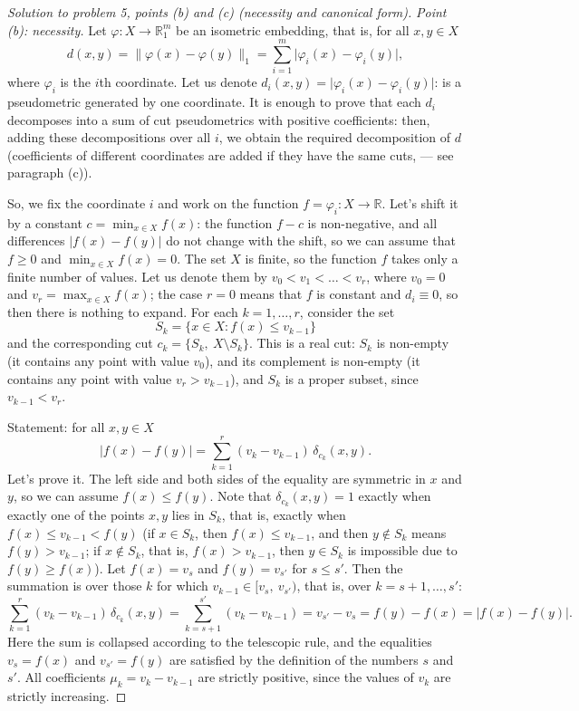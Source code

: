 \documentclass[a4paper,12pt]{report}
\begin{document}
\begin{proof}[Solution to problem \textup{5}, points \textup{(b)} and \textup{(c)} \textup{(}necessity and canonical form\textup{)}]
\textit{Point \textup{(b)}\textup{:} necessity.} Let $\varphi\colon X\to\mathbb R^m_1$ be an isometric embedding, that is, for all $x,y\in X$
\[
d(x,y)=\|\varphi(x)-\varphi(y)\|_1=\sum_{i=1}^m\bigl|\varphi_i(x)-\varphi_i(y)\bigr|,
\]
where $\varphi_i$ is the $i$th coordinate. Let us denote $d_i(x,y)=\bigl|\varphi_i(x)-\varphi_i(y)\bigr|$\textup{:} is a pseudometric generated by one coordinate. It is enough to prove that each $d_i$ decomposes into a sum of cut pseudometrics with positive coefficients\textup{:} then, adding these decompositions over all $i$, we obtain the required decomposition of $d$ (coefficients of different coordinates are added if they have the same cuts, --- see paragraph \textup{(c)}).

So, we fix the coordinate $i$ and work on the function $f=\varphi_i\colon X\to\mathbb R$. Let's shift it by a constant $c=\min_{x\in X}f(x)$\textup{:} the function $f-c$ is non-negative, and all differences $\bigl|f(x)-f(y)\bigr|$ do not change with the shift, so we can assume that $f\ge0$ and $\min_{x\in X}f(x)=0$. The set $X$ is finite, so the function $f$ takes only a finite number of values. Let us denote them by $v_0<v_1<\dots<v_r$, where $v_0=0$ and $v_r=\max_{x\in X}f(x)$\textup{;} the case $r=0$ means that $f$ is constant and $d_i\equiv0$, so then there is nothing to expand. For each $k=1,\dots,r$, consider the set
\[
S_k=\{x\in X:f(x)\le v_{k-1}\}
\]
and the corresponding cut $c_k=\{S_k,\ X\setminus S_k\}$. This is a real cut\textup{:} $S_k$ is non-empty (it contains any point with value $v_0$), and its complement is non-empty (it contains any point with value $v_r>v_{k-1}$), and $S_k$ is a proper subset, since $v_{k-1}<v_r$.

Statement\textup{:} for all $x,y\in X$
\[
\bigl|f(x)-f(y)\bigr|=\sum_{k=1}^{r}(v_k-v_{k-1})\,\delta_{c_k}(x,y).
\]
Let's prove it. The left side and both sides of the equality are symmetric in $x$ and $y$, so we can assume $f(x)\le f(y)$. Note that $\delta_{c_k}(x,y)=1$ exactly when exactly one of the points $x,y$ lies in $S_k$, that is, exactly when $f(x)\le v_{k-1}<f(y)$ \textup{(}if $x\in S_k$, then $f(x)\le v_{k-1}$, and then $y\notin S_k$ means $f(y)>v_{k-1}$\textup{;} if $x\notin S_k$, that is, $f(x)>v_{k-1}$, then $y\in S_k$ is impossible due to $f(y)\ge f(x)$\textup{)}. Let $f(x)=v_s$ and $f(y)=v_{s'}$ for $s\le s'$. Then the summation is over those $k$ for which $v_{k-1}\in[v_s,\ v_{s'})$, that is, over $k=s+1,\dots,s'$\textup{:}
\[
\sum_{k=1}^{r}(v_k-v_{k-1})\,\delta_{c_k}(x,y)=\sum_{k=s+1}^{s'}(v_k-v_{k-1})=v_{s'}-v_s=f(y)-f(x)=\bigl|f(x)-f(y)\bigr|.
\]
Here the sum is collapsed according to the telescopic rule, and the equalities $v_s=f(x)$ and $v_{s'}=f(y)$ are satisfied by the definition of the numbers $s$ and $s'$. All coefficients $\mu_k=v_k-v_{k-1}$ are strictly positive, since the values of $v_k$ are strictly increasing.


\end{proof}
\end{document}
